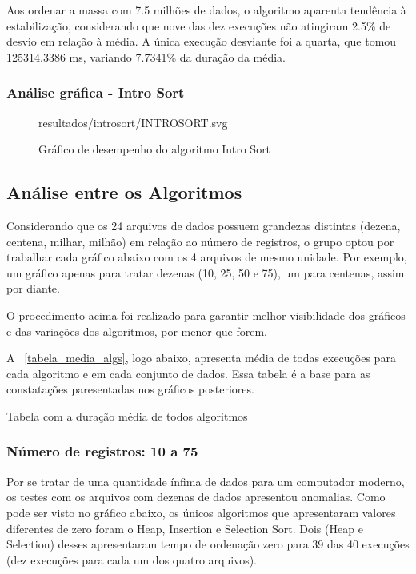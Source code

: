 \documentclass[a4paper,12pt]{scrartcl}
\begin{document}
Aos ordenar a massa com 7.5 milhões de dados, o algoritmo aparenta tendência à estabilização, considerando que nove das dez execuções não atingiram 2.5\% de desvio em relação à média. A única execução desviante foi a quarta, que tomou 125314.3386 ms, variando 7.7341\% da duração da média.

\subsubsection{Análise gráfica - Intro Sort}
\begin{figure}[H]
    \centering
    
    {resultados/introsort/INTROSORT.svg}
    \caption{Gráfico de desempenho do algoritmo Intro Sort}
    \label{mapaSelect}
\end{figure}


\subsection{Análise entre os Algoritmos}
Considerando que os 24 arquivos de dados possuem grandezas distintas (dezena, centena, milhar, milhão) em relação ao número de registros, o grupo optou por trabalhar cada gráfico abaixo com os 4 arquivos de mesmo unidade. Por exemplo, um gráfico apenas para tratar dezenas (10, 25, 50 e 75), um para centenas, assim por diante.

O procedimento acima foi realizado para garantir melhor visibilidade dos gráficos e das variações dos algoritmos, por menor que forem.

A ~\autoref{tabela_media_algs}, logo abaixo, apresenta média de todas execuções para cada algoritmo e em cada conjunto de dados. Essa tabela é a base para as constatações paresentadas nos gráficos posteriores.

\begin{table}[H]
    
    \scalebox{0.8}
    {}
    
    \caption{Tabela com a duração média de todos algoritmos}
    \label{tabela_media_algs}

\end{table}

\subsubsection{Número de registros: 10 a 75}

Por se tratar de uma quantidade ínfima de dados para um computador moderno, os testes com os arquivos com dezenas de dados apresentou anomalias. Como pode ser visto no gráfico abaixo, os únicos algoritmos que apresentaram valores diferentes de zero foram o Heap, Insertion e Selection Sort. Dois (Heap e Selection) desses apresentaram tempo de ordenação zero para 39 das 40 execuções (dez execuções para cada um dos quatro arquivos).
\end{document}
